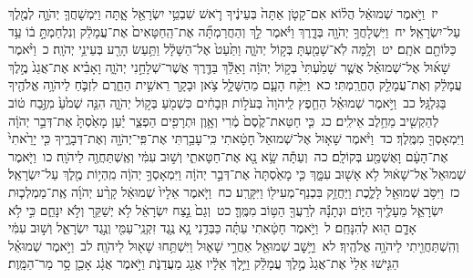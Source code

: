 \documentclass[18pt]{article}
\begin{document}
 {\loc יז~}וַיֹּ֣אמֶר שְׁמוּאֵ֔ל הֲל֗וֹא אִם־קָטֹ֤ן אַתָּה֙ בְּעֵינֶ֔יךָ רֹ֛אשׁ שִׁבְטֵ֥י יִשְׂרָאֵ֖ל אָ֑תָּה וַיִּמְשָׁחֲךָ֧ יְהֹוָ֛ה לְמֶ֖לֶךְ עַל־יִשְׂרָאֵֽל׃ \startlock
 {\loc יח~}וַיִּשְׁלָחֲךָ֥ יְהֹוָ֖ה בְּדָ֑רֶךְ וַיֹּ֗אמֶר לֵ֣ךְ וְהַחֲרַמְתָּ֞ה אֶת־הַֽחַטָּאִים֙ אֶת־עֲמָלֵ֔ק וְנִלְחַמְתָּ֣ ב֔וֹ עַ֥ד כַּלּוֹתָ֖ם אֹתָֽם׃ \startlock
 {\loc יט~}וְלָ֥מָּה לֹֽא־שָׁמַ֖עְתָּ בְּק֣וֹל יְהֹוָ֑ה וַתַּ֙עַט֙ אֶל־הַשָּׁלָ֔ל וַתַּ֥עַשׂ הָרַ֖ע בְּעֵינֵ֥י יְהֹוָֽה׃ \startlock
 {\loc כ~}וַיֹּ֨אמֶר שָׁא֜וּל אֶל־שְׁמוּאֵ֗ל אֲשֶׁ֤ר שָׁמַ֙עְתִּי֙ בְּק֣וֹל יְהֹוָ֔ה וָאֵלֵ֕ךְ בַּדֶּ֖רֶךְ אֲשֶׁר־שְׁלָחַ֣נִי יְהֹוָ֑ה וָאָבִ֗יא אֶת־אֲגַג֙ מֶ֣לֶךְ עֲמָלֵ֔ק וְאֶת־עֲמָלֵ֖ק הֶחֱרַֽמְתִּי׃ \startlock
 {\loc כא~}וַיִּקַּ֨ח הָעָ֧ם מֵהַשָּׁלָ֛ל צֹ֥אן וּבָקָ֖ר רֵאשִׁ֣ית הַחֵ֑רֶם לִזְבֹּ֛חַ לַיהֹוָ֥ה אֱלֹהֶ֖יךָ בַּגִּלְגָּֽל׃ \startlock
 {\loc כב~}וַיֹּ֣אמֶר שְׁמוּאֵ֗ל הַחֵ֤פֶץ לַֽיהֹוָה֙ בְּעֹל֣וֹת וּזְבָחִ֔ים כִּשְׁמֹ֖עַ בְּק֣וֹל יְהֹוָ֑ה הִנֵּ֤ה שְׁמֹ֙עַ֙ מִזֶּ֣בַח ט֔וֹב לְהַקְשִׁ֖יב מֵחֵ֥לֶב אֵילִֽים׃ \startlock
 {\loc כג~}כִּ֤י חַטַּאת־קֶ֙סֶם֙ מֶ֔רִי וְאָ֥וֶן וּתְרָפִ֖ים הַפְצַ֑ר יַ֗עַן מָאַ֙סְתָּ֙ אֶת־דְּבַ֣ר יְהֹוָ֔ה וַיִּמְאָסְךָ֖ מִמֶּֽלֶךְ׃ \startlock
 {\loc כד~}וַיֹּ֨אמֶר שָׁא֤וּל אֶל־שְׁמוּאֵל֙ חָטָ֔אתִי כִּֽי־עָבַ֥רְתִּי אֶת־פִּֽי־יְהֹוָ֖ה וְאֶת־דְּבָרֶ֑יךָ כִּ֤י יָרֵ֙אתִי֙ אֶת־הָעָ֔ם וָאֶשְׁמַ֖ע בְּקוֹלָֽם׃ \startlock
 {\loc כה~}וְעַתָּ֕ה שָׂ֥א נָ֖א אֶת־חַטָּאתִ֑י וְשׁ֣וּב עִמִּ֔י וְאֶֽשְׁתַּחֲוֶ֖ה לַיהֹוָֽה׃ \startlock
 {\loc כו~}וַיֹּ֤אמֶר שְׁמוּאֵל֙ אֶל־שָׁא֔וּל לֹ֥א אָשׁ֖וּב עִמָּ֑ךְ כִּ֤י מָאַ֙סְתָּה֙ אֶת־דְּבַ֣ר יְהֹוָ֔ה וַיִּמְאָסְךָ֣ יְהֹוָ֔ה מִֽהְי֥וֹת מֶ֖לֶךְ עַל־יִשְׂרָאֵֽל׃ \startlock
 {\loc כז~}וַיִּסֹּ֥ב שְׁמוּאֵ֖ל לָלֶ֑כֶת וַיַּחֲזֵ֥ק בִּכְנַף־מְעִיל֖וֹ וַיִּקָּרַֽע׃ \startlock
 {\loc כח~}וַיֹּ֤אמֶר אֵלָיו֙ שְׁמוּאֵ֔ל קָרַ֨ע יְהֹוָ֜ה אֶֽת־מַמְלְכ֧וּת יִשְׂרָאֵ֛ל מֵעָלֶ֖יךָ הַיּ֑וֹם וּנְתָנָ֕הּ לְרֵעֲךָ֖ הַטּ֥וֹב מִמֶּֽךָּ׃ \startlock
 {\loc כט~}וְגַם֙ נֵ֣צַח יִשְׂרָאֵ֔ל לֹ֥א יְשַׁקֵּ֖ר וְלֹ֣א יִנָּחֵ֑ם כִּ֣י לֹ֥א אָדָ֛ם ה֖וּא לְהִנָּחֵֽם׃ \startlock
 {\loc ל~}וַיֹּ֣אמֶר חָטָ֔אתִי עַתָּ֗ה כַּבְּדֵ֥נִי נָ֛א נֶ֥גֶד זִקְנֵֽי־עַמִּ֖י וְנֶ֣גֶד יִשְׂרָאֵ֑ל וְשׁ֣וּב עִמִּ֔י וְהִֽשְׁתַּחֲוֵ֖יתִי לַיהֹוָ֥ה אֱלֹהֶֽיךָ׃ \startlock
 {\loc לא~}וַיָּ֥שׇׁב שְׁמוּאֵ֖ל אַחֲרֵ֣י שָׁא֑וּל וַיִּשְׁתַּ֥חוּ שָׁא֖וּל לַיהֹוָֽה׃ \startlock
 {\loc לב~}וַיֹּ֣אמֶר שְׁמוּאֵ֗ל הַגִּ֤ישׁוּ אֵלַי֙ אֶת־אֲגַג֙ מֶ֣לֶךְ עֲמָלֵ֔ק וַיֵּ֣לֶךְ אֵלָ֔יו אֲגַ֖ג מַעֲדַנֹּ֑ת וַיֹּ֣אמֶר אֲגָ֔ג אָכֵ֖ן סָ֥ר מַר־הַמָּֽוֶת׃ \startlock
\end{document}
